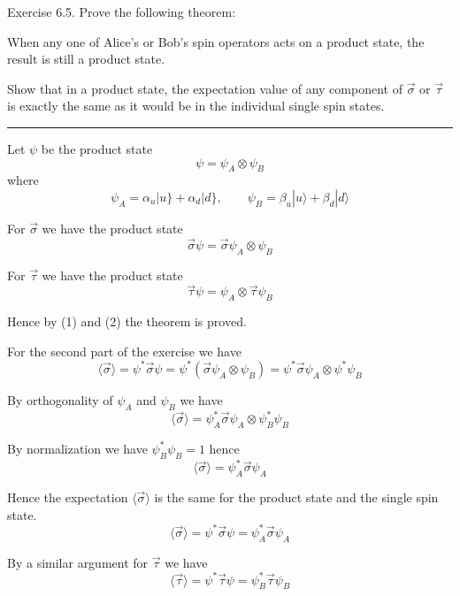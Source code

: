 \documentclass[12pt]{article}
\begin{document}
Exercise 6.5.
Prove the following theorem:

\bigskip
When any one of Alice's or Bob's spin operators acts on a
product state, the result is still a product state.

\bigskip
Show that in a product state, the expectation value of any
component of $\vec\sigma$ or $\vec\tau$ is exactly the same as it
would be in the individual single spin states.

\bigskip
\hrule

\bigskip
Let $\psi$ be the product state
\begin{equation*}
\psi=\psi_A\otimes\psi_B
\end{equation*}
where
\begin{equation*}
\psi_A=\alpha_u|u\}+\alpha_d|d\},
\qquad
\psi_B=\beta_u|u\rangle+\beta_d|d\rangle
\end{equation*}

For $\vec\sigma$ we have the product state
\begin{equation*}
\vec\sigma\psi=\vec\sigma\psi_A\otimes\psi_B
\tag{1}
\end{equation*}

For $\vec\tau$ we have the product state
\begin{equation*}
\vec\tau\psi=\psi_A\otimes\vec\tau\psi_B
\tag{2}
\end{equation*}

Hence by (1) and (2) the theorem is proved.

\bigskip
For the second part of the exercise we have
\begin{equation*}
\langle\vec\sigma\rangle
=\psi^*\vec\sigma\psi
=\psi^*(\vec\sigma\psi_A\otimes\psi_B)
=\psi^*\vec\sigma\psi_A\otimes\psi^*\psi_B
\end{equation*}

By orthogonality of $\psi_A$ and $\psi_B$ we have
\begin{equation*}
\langle\vec\sigma\rangle=\psi_A^*\vec\sigma\psi_A\otimes\psi_B^*\psi_B
\end{equation*}

By normalization we have $\psi_B^*\psi_B=1$ hence
\begin{equation*}
\langle\vec\sigma\rangle=\psi_A^*\vec\sigma\psi_A
\end{equation*}

Hence the expectation $\langle\vec\sigma\rangle$
is the same for the product state and the single spin state.
\begin{equation*}
\langle\vec\sigma\rangle=\psi^*\vec\sigma\psi=\psi_A^*\vec\sigma\psi_A
\end{equation*}

By a similar argument for $\vec\tau$ we have
\begin{equation*}
\langle\vec\tau\rangle=\psi^*\vec\tau\psi=\psi_B^*\vec\tau\psi_B
\end{equation*}
\end{document}
